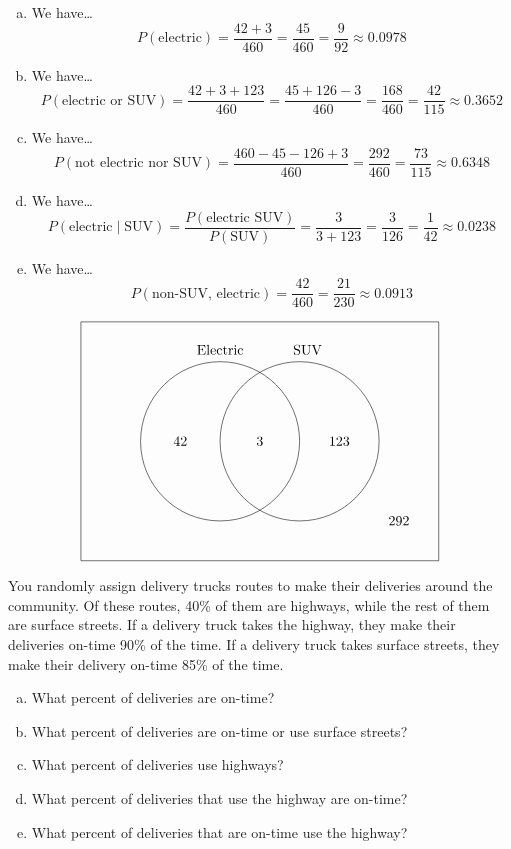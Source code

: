 \documentclass[11pt,letterpaper]{article}
\begin{document}
\sol 
\begin{enumerate}[(a)]
\item We have\dots
	\[
	P(\text{electric})= \dfrac{42 + 3}{460}= \dfrac{45}{460}= \dfrac{9}{92} \approx 0.0978
	\] \pspace

\item We have\dots
	\[
	P(\text{electric or SUV})= \dfrac{42 + 3 + 123}{460}= \dfrac{45 + 126 - 3}{460}= \dfrac{168}{460}= \dfrac{42}{115} \approx 0.3652
	\] \pspace

\item We have\dots
	\[
	P(\text{not electric nor SUV})= \dfrac{460 - 45 - 126 + 3}{460}= \dfrac{292}{460}= \dfrac{73}{115} \approx 0.6348
	\] \pspace

\item We have\dots
	\[
	P(\text{electric} \;|\; \text{SUV})= \dfrac{P(\text{electric SUV})}{P(\text{SUV})}= \dfrac{3}{3 + 123}= \dfrac{3}{126}= \dfrac{1}{42} \approx 0.0238
	\] \pspace

\item We have\dots
	\[
	P(\text{non-SUV, electric})= \dfrac{42}{460}= \dfrac{21}{230} \approx 0.0913
	\]
\end{enumerate} \vfill

	\[
	\begin{tikzpicture}
	\draw (0,0) rectangle (9,6);
	\draw (3.5,3) circle (2);
	\draw (5.5,3) circle (2);
	
	\node at (3.5,5.3) {Electric};
	\node at (5.7,5.3) {SUV}; 
	
	\node at (2.5,3) {42};
	\node at (4.5,3) {3};
	\node at (6.5,3) {123};
	\node at (8,1) {292};
	\end{tikzpicture}
	\]



\newpage



 You randomly assign delivery trucks routes to make their deliveries around the community. Of these routes, 40\% of them are highways, while the rest of them are surface streets. If a delivery truck takes the highway, they make their deliveries on-time 90\% of the time. If a delivery truck takes surface streets, they make their delivery on-time 85\% of the time.
	\begin{enumerate}[(a)]
	\item What percent of deliveries are on-time?
	\item What percent of deliveries are on-time or use surface streets?
	\item What percent of deliveries use highways?
	\item What percent of deliveries that use the highway are on-time?
	\item What percent of deliveries that are on-time use the highway?
	\end{enumerate} \pspace
\end{document}
